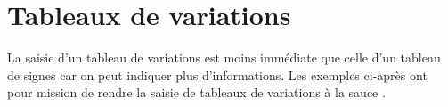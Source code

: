 \documentclass[10pt, a4paper]{article}
\begin{document}
\section{Tableaux de variations}

La saisie d'un tableau de variations est moins immédiate que celle d'un tableau de signes car on peut indiquer plus d'informations. Les exemples ci-après ont pour mission de rendre  la saisie de tableaux de variations à la sauce \thispack.
\end{document}
